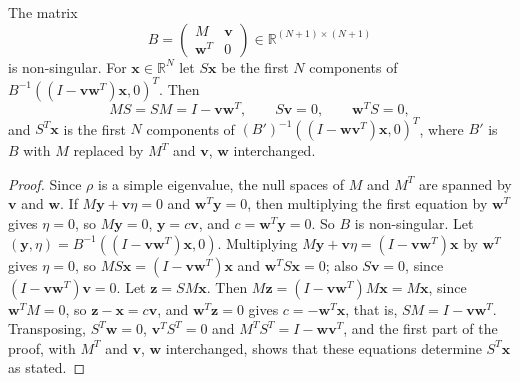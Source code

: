 \begin{lemma}\label{bordered}
The matrix
\begin{equation*}
B=\begin{pmatrix}M&\bm v\\ \bm w^T&0\end{pmatrix}\in\mathbb{R}^{(N+1)\times(N+1)}
\end{equation*}
is non-singular. For $\bm x\in\mathbb{R}^N$ let $S\bm x$ be the first $N$
components of $B^{-1}\left((I-\bm v\bm w^T)\bm x,0\right)^T$. Then
\begin{equation*}
MS=SM=I-\bm v\bm w^T,\qquad S\bm v=0,\qquad \bm w^TS=0,
\end{equation*}
and $S^T\bm x$ is the first $N$ components of
$\left(B'\right)^{-1}\left((I-\bm w\bm v^T)\bm x,0\right)^T$, where $B'$ is $B$ with
$M$ replaced by $M^T$ and $\bm v$, $\bm w$ interchanged.
\end{lemma}
\begin{proof}
Since $\rho$ is a simple eigenvalue, the null spaces of $M$ and $M^T$ are
spanned by $\bm v$ and $\bm w$. If $M\bm y+\bm v\eta=0$ and $\bm w^T\bm y=0$,
then multiplying the first equation by $\bm w^T$ gives $\eta=0$, so
$M\bm y=0$, $\bm y=c\bm v$, and $c=\bm w^T\bm y=0$. So $B$ is non-singular.
Let $(\bm y,\eta)=B^{-1}\left((I-\bm v\bm w^T)\bm x,0\right)$. Multiplying
$M\bm y+\bm v\eta=(I-\bm v\bm w^T)\bm x$ by $\bm w^T$ gives $\eta=0$, so
$MS\bm x=(I-\bm v\bm w^T)\bm x$ and $\bm w^TS\bm x=0$; also $S\bm v=0$,
since $(I-\bm v\bm w^T)\bm v=0$. Let $\bm z=SM\bm x$. Then
$M\bm z=(I-\bm v\bm w^T)M\bm x=M\bm x$, since $\bm w^TM=0$, so
$\bm z-\bm x=c\bm v$, and $\bm w^T\bm z=0$ gives $c=-\bm w^T\bm x$, that is,
$SM=I-\bm v\bm w^T$. Transposing, $S^T\bm w=0$, $\bm v^TS^T=0$ and
$M^TS^T=I-\bm w\bm v^T$, and the first part of the proof, with $M^T$ and
$\bm v$, $\bm w$ interchanged, shows that these equations determine $S^T\bm x$
as stated.
\end{proof}

